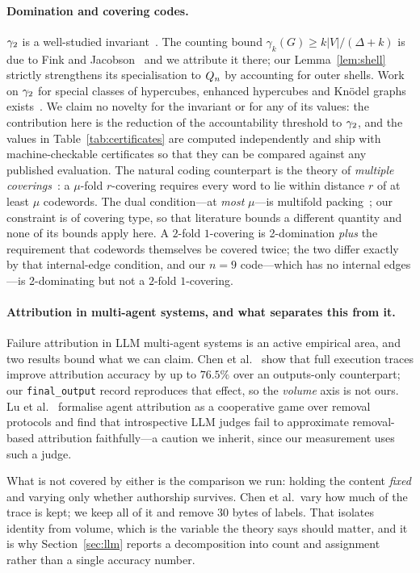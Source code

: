 \paragraph{Domination and covering codes.}
$\gamma_2$ is a well-studied invariant~\cite{chellalisurvey,bujtasjasko}. The counting bound
$\gamma_k(G) \ge k|V|/(\Delta+k)$ is due to Fink and
Jacobson~\cite{finkjacobson1985} and we attribute it there; our
Lemma~\ref{lem:shell} strictly strengthens its
specialisation to $Q_n$ by accounting for outer shells. Work on $\gamma_2$ for special classes of hypercubes, enhanced hypercubes and
Kn\"odel graphs exists~\cite{arulanand2023}. We claim no novelty for the
invariant or for any of its values: the contribution here is the reduction of
the accountability threshold to $\gamma_2$, and the values in
Table~\ref{tab:certificates} are computed independently and ship with
machine-checkable certificates so that they can be compared against any
published evaluation. The natural coding
counterpart is the theory of \emph{multiple
coverings}~\cite{coveringcodes}: a $\mu$-fold $r$-covering
requires every word to lie within distance $r$ of at least $\mu$ codewords. The
dual condition---at \emph{most} $\mu$---is multifold packing~\cite{krotovpotapov};
our constraint is of covering type, so that literature bounds a different
quantity and none of its bounds apply here.
A $2$-fold $1$-covering is 2-domination \emph{plus} the requirement that
codewords themselves be covered twice; the two differ exactly by that
internal-edge condition, and our $n = 9$ code---which has no internal edges---is
2-dominating but not a $2$-fold $1$-covering.

\paragraph{Attribution in multi-agent systems, and what separates this from it.}
Failure attribution in LLM multi-agent systems is an active empirical area, and
two results bound what we can claim. Chen et al.~\cite{chen2026elephant} show
that full execution traces improve attribution accuracy by up to $76.5\%$ over an
outputs-only counterpart; our \texttt{final\_output} record reproduces that
effect, so the \emph{volume} axis is not ours. Lu et
al.~\cite{lu2026agentsmatter} formalise agent attribution as a cooperative game
over removal protocols and find that introspective LLM judges fail to approximate
removal-based attribution faithfully---a caution we inherit, since our
measurement uses such a judge.

What is not covered by either is the comparison we run: holding the content
\emph{fixed} and varying only whether authorship survives. Chen et al.\ vary how
much of the trace is kept; we keep all of it and remove $30$ bytes of labels.
That isolates identity from volume, which is the variable the theory says should
matter, and it is why Section~\ref{sec:llm} reports a decomposition into count
and assignment rather than a single accuracy number.

